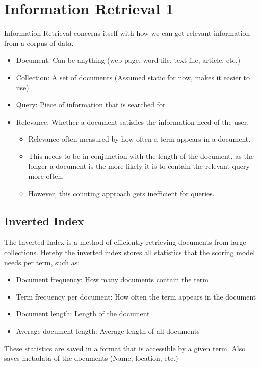 \documentclass[
../../NLP4W_Summary.tex,
]
{subfiles}
\begin{document}
\section{Information Retrieval 1}
Information Retrieval concerns itself with how we can get relevant information from a corpus of data.

\begin{defbox}
    \begin{itemize}
        \item Document: Can be anything (web page, word file, text file, article, etc.)
        \item Collection: A set of documents (Assumed static for now, makes it easier to use)
        \item Query: Piece of information that is searched for
        \item Relevance: Whether a document satisfies the information need of the user.
        \begin{itemize}
            \item Relevance often measured by how often a term appears in a document.
            \item This needs to be in conjunction with the length of the document, as the longer a document is the more likely it is to contain the relevant query more often.
            \item However, this counting approach gets inefficient for queries.
        \end{itemize}
    \end{itemize}
\end{defbox}

\subsection{Inverted Index}
The Inverted Index is a method of efficiently retrieving documents from large collections.
Hereby the inverted index stores all statistics that the scoring model needs per term, such as:
\begin{itemize}
    \item Document frequency: How many documents contain the term
    \item Term frequency per document: How often the term appears in the document
    \item Document length: Length of the document
    \item Average document length: Average length of all documents
\end{itemize} 
These statistics are saved in a format that is accessible by a given term. Also saves metadata of the documents (Name, location, etc.)
\end{document}
